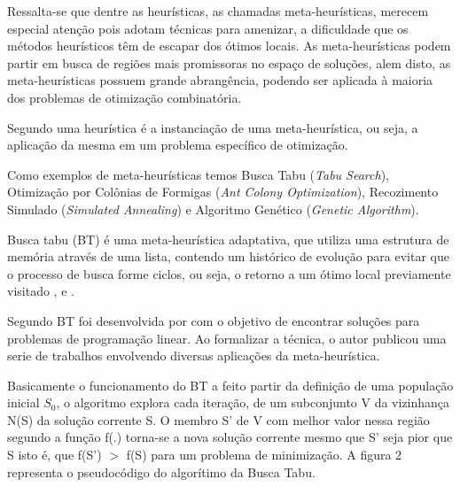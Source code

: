 Ressalta-se que dentre as heurísticas, as chamadas meta-heurísticas, merecem especial atenção pois adotam técnicas para amenizar, a dificuldade que os métodos heurísticos têm de escapar dos ótimos locais. As meta-heurísticas podem partir em busca de regiões mais promissoras no espaço de soluções, alem disto, as meta-heurísticas possuem grande abrangência, podendo ser aplicada à maioria dos problemas de otimização combinatória.\cite{nascimento2005aplicaccao}\par

Segundo \cite{adrianocesar} uma heurística é a instanciação de uma meta-heurística, ou seja, a aplicação da mesma em um problema específico de otimização.\par

Como exemplos de meta-heurísticas temos Busca Tabu (\textit{Tabu Search}), Otimização por Colônias de Formigas (\textit{Ant Colony Optimization}), Recozimento Simulado (\textit{Simulated Annealing}) e Algoritmo Genético (\textit{Genetic Algorithm}).\par


Busca tabu (BT) é uma meta-heurística adaptativa, que utiliza uma estrutura de memória através de uma lista, contendo um histórico de evolução para evitar que o processo de busca forme ciclos, ou seja, o retorno a um ótimo local previamente visitado \cite{souza2000} , \cite{armentanointroduccao} e \cite{subramanian2006aplicaccao}.\par


Segundo \cite{subramanian2006aplicaccao} BT foi desenvolvida por \cite{glover1986future} com o objetivo de encontrar soluções para problemas de programação linear. Ao formalizar a técnica, o autor publicou uma serie de trabalhos envolvendo diversas aplicações da meta-heurística. \par

Basicamente o funcionamento do BT a feito partir da definição de uma população inicial ${S_0}$, o algoritmo explora cada iteração, de um subconjunto V da vizinhança N(S) da solução corrente S. O membro S’ de V com melhor valor nessa região segundo a função f(.) torna-se a nova solução corrente mesmo que S’ seja pior que S isto é, que f(S’) $>$ f(S) para um problema de minimização\cite{souza2000}. A figura 2 representa o pseudocódigo do algorítimo da Busca Tabu.

